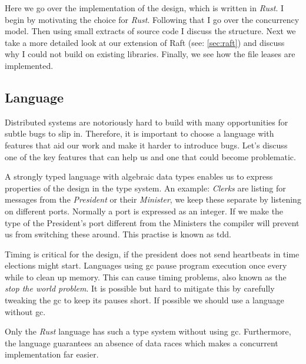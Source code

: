 Here we go over the implementation of the design, which is written in \textit{Rust}. I begin by motivating the choice for \textit{Rust}. Following that I go over the concurrency model. Then using small extracts of source code I discuss the structure. Next we take a more detailed look at our extension of Raft (see: \cref{sec:raft}) and discuss why I could not build on existing libraries. Finally, we see how the file leases are implemented.

\subsection{Language}
Distributed systems are notoriously hard to build with many opportunities for subtle bugs to slip in. Therefore, it is important to choose a language with features that aid our work and make it harder to introduce bugs. Let's discuss one of the key features that can help us and one that could become problematic.

A strongly typed language with algebraic data types enables us to express properties of the design in the type system. An example: \textit{Clerks} are listing for messages from the \textit{President} or their \textit{Minister}, we keep these separate by listening on different ports. Normally a port is expressed as an integer. If we make the type of the President's port different from the Ministers the compiler will prevent us from switching these around. This practise is known as \ac{tdd}.

Timing is critical for the design, if the president does not send heartbeats in time elections might start. Languages using \ac{gc} pause program execution once every while to clean up memory. This can cause timing problems, also known as the \textit{stop the world problem}. It is possible but hard to mitigate this by carefully tweaking the \ac{gc} to keep its pauses short. If possible we should use a language without \ac{gc}.

Only the \textit{Rust} language has such a type system without using \ac{gc}. Furthermore, the language guarantees an absence of data races which makes a concurrent implementation far easier.

